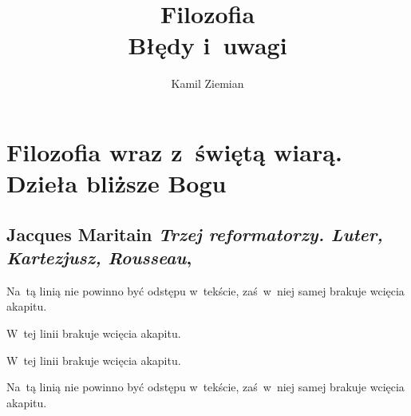 \documentclass[a4paper,11pt]{article}
\title{Filozofia \\
  {\Large Błędy i~uwagi}}
\author{Kamil Ziemian}
\numberwithin{equation}{section}
\begin{document}





\maketitle





\section{Filozofia wraz z~świętą wiarą. Dzieła bliższe Bogu}




\subsection{Jacques Maritain
  \textit{Trzej reformatorzy. Luter, Kartezjusz, Rousseau},
  \cite{MaritainTrzejReformatorzy2005}}

\vspace{0em}



\vspace{0em}


\noindent
{} Na~tą linią nie powinno być odstępu w~tekście,
zaś~w~niej samej brakuje wcięcia akapitu.

\VerSpaceFour





\noindent
{} W~tej linii brakuje wcięcia akapitu.

\VerSpaceFour





\noindent
{} W~tej linii brakuje wcięcia akapitu.

\VerSpaceFour





\noindent
{} Na~tą linią nie powinno być odstępu w~tekście,
zaś~w~niej samej brakuje wcięcia akapitu.
\end{document}
